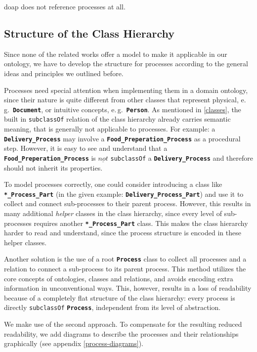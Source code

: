 \documentclass[a4paper, DIV=13, BCOR=0cm]{scrbook}
\newcommand{\eg}{e.\,g.\ }
\newcommand{\class}[1]{\texttt{\textbf{#1}}}
\newcommand{\relation}[1]{\texttt{#1}}
\begin{document}
\gls{doap} does not reference processes at all.

\subsection{Structure of the Class Hierarchy}
\label{process-subclass}
Since none of the related works offer a model to make it applicable in our ontology, we have to develop the structure for processes according to the general ideas and principles we outlined before.

Processes need special attention when implementing them in a domain ontology, since their nature is quite different from other classes that represent physical, \eg \class{Document}, or intuitive concepts, \eg \class{Person}. As mentioned in \ref{classes}, the built in \relation{subclassOf} relation of the class hierarchy already carries semantic meaning, that is generally not applicable to processes. For example: a \class{Delivery\_Process} may involve a \class{Food\_Preperation\_Process} as a procedural step. However, it is easy to see and understand that a \class{Food\_Preperation\_Process} is $\underline{not}$ \relation{subclassOf} a \class{Delivery\_Process} and therefore should not inherit its properties.

To model processes correctly, one could consider introducing a class like \class{*\_Process\_Part} (in the given example: \class{Delivery\_Process\_Part}) and use it to collect and connect sub-processes to their parent process. However, this results in many additional \textit{helper} classes in the class hierarchy, since every level of sub-processes requires another \class{*\_Process\_Part} class. This makes the class hierarchy harder to read and understand, since the process structure is encoded in these helper classes.

Another solution is the use of a root \class{Process} class to collect all processes and a relation to connect a sub-process to its parent process. This method utilizes the core concepts of ontologies, classes and relations, and avoids encoding extra information in unconventional ways. This, however, results in a loss of readability because of a completely flat structure of the class hierarchy: every process is directly \relation{subclassOf} \class{Process}, independent from its level of abstraction.

We make use of the second approach. To compensate for the resulting reduced readability, we add diagrams to describe the processes and their relationships graphically (see appendix \ref{process-diagrams}).
\end{document}
